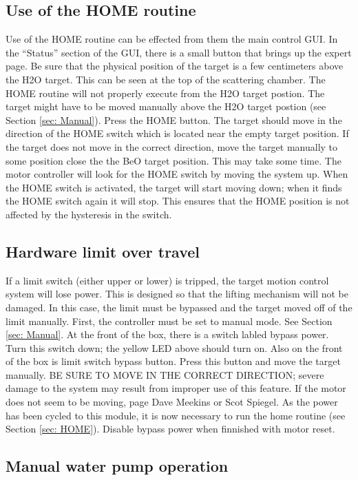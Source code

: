 \subsection{Use of the HOME routine\label{sec: HOME}}

Use of the HOME routine can be effected from them the main control
GUI. In the {}``Status'' section of the GUI, there is a small button
that brings up the expert page. Be sure that the physical position
of the target is a few centimeters above the H2O target. This can
be seen at the top of the scattering chamber. The HOME routine will
not properly execute from the H2O target postion. The target might
have to be moved manually above the H2O target postion (see Section
\ref{sec: Manual}). Press the HOME button. The target should move
in the direction of the HOME switch which is located near the empty
target position. If the target does not move in the correct direction,
move the target manually to some position close the the BeO target
position. This may take some time. The motor controller will look
for the HOME switch by moving the system up. When the HOME switch
is activated, the target will start moving down; when it finds the
HOME switch again it will stop. This ensures that the HOME position
is not affected by the hysteresis in the switch.


\subsection{Hardware limit over travel}

If a limit switch (either upper or lower) is tripped, the target motion
control system will lose power. This is designed so that the lifting
mechanism will not be damaged. In this case, the limit must be bypassed
and the target moved off of the limit manually. First, the controller
must be set to manual mode. See Section \ref{sec: Manual}. At the
front of the box, there is a switch labled bypass power. Turn this
switch down; the yellow LED above should turn on. Also on the front
of the box is limit switch bypass button. Press this button and move
the target manually. BE SURE TO MOVE IN THE CORRECT DIRECTION; severe
damage to the system may result from improper use of this feature.
If the motor does not seem to be moving, page Dave Meekins or Scot
Spiegel. As the power has been cycled to this module, it is now necessary
to run the home routine (see Section \ref{sec: HOME}). Disable bypass
power when finnished with motor reset.


\subsection{Manual water pump operation}


